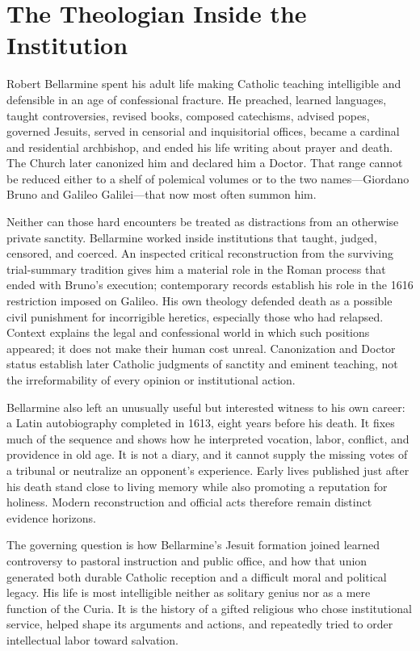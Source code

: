 \section*{The Theologian Inside the Institution}

Robert Bellarmine spent his adult life making Catholic teaching intelligible
and defensible in an age of confessional fracture.  He preached, learned
languages, taught controversies, revised books, composed catechisms, advised
popes, governed Jesuits, served in censorial and inquisitorial offices, became
a cardinal and residential archbishop, and ended his life writing about prayer
and death.  The Church later canonized him and declared him a Doctor.  That
range cannot be reduced either to a shelf of polemical volumes or to the two
names---Giordano Bruno and Galileo Galilei---that now most often summon him.

Neither can those hard encounters be treated as distractions from an otherwise
private sanctity.  Bellarmine worked inside institutions that taught, judged,
censored, and coerced.  An inspected critical reconstruction from the surviving
trial-summary tradition gives him a material role in the Roman process that
ended with Bruno's execution; contemporary records establish his role in the
1616 restriction imposed on Galileo.  His own theology defended death as a
possible civil punishment for incorrigible heretics, especially those who had
relapsed.  Context explains the legal and
confessional world in which such positions appeared; it does not make their
human cost unreal.  Canonization and Doctor status establish later Catholic
judgments of sanctity and eminent teaching, not the irreformability of every
opinion or institutional action.

Bellarmine also left an unusually useful but interested witness to his own
career: a Latin autobiography completed in 1613, eight years before his death.
It fixes much of the sequence and shows how he interpreted vocation, labor,
conflict, and providence in old age.  It is not a diary, and it cannot supply
the missing votes of a tribunal or neutralize an opponent's experience.  Early
lives published just after his death stand close to living memory while also
promoting a reputation for holiness.  Modern reconstruction and official acts
therefore remain distinct evidence horizons.

The governing question is how Bellarmine's Jesuit formation joined learned
controversy to pastoral instruction and public office, and how that union
generated both durable Catholic reception and a difficult moral and political
legacy.  His life is most intelligible neither as solitary genius nor as a
mere function of the Curia.  It is the history of a gifted religious who chose
institutional service, helped shape its arguments and actions, and repeatedly
tried to order intellectual labor toward salvation.
